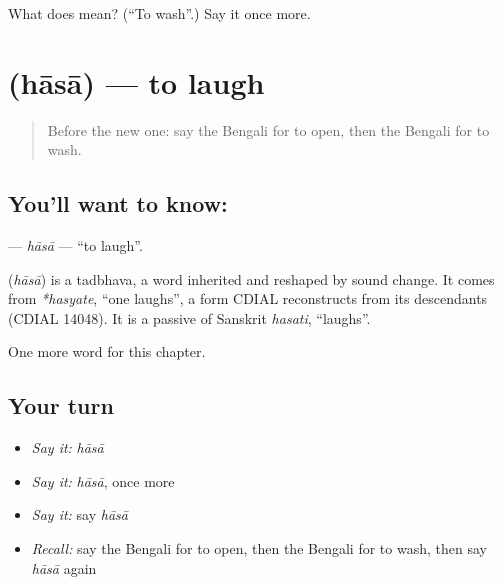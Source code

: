 \begin{tcolorbox}[breakable,colback=teal!4,colframe=teal!35!black,title={Before you move on}]
What does  mean? (\textquotedblleft{}To wash\textquotedblright{}.) Say it once more.
\end{tcolorbox}
\section[\texorpdfstring{\bn{হাসা} (hāsā)}{হাসা (hāsā)}]{ (hāsā) — to laugh}

\label{lesson:BN-C50-hasa}



\begin{quote}
Before the new one: say the Bengali for to open, then the Bengali for to wash.
\end{quote}

\subsection*{You'll want to know: }
\textbf{} — \emph{hāsā} — \textquotedblleft{}to laugh\textquotedblright{}.

\begin{cousinweb}
\textbf{} (\emph{hāsā}) is a tadbhava, a word inherited and reshaped by sound change. It comes from \emph{*hasyate}, \textquotedblleft{}one laughs\textquotedblright{}, a form CDIAL reconstructs from its descendants (CDIAL 14048). It is a passive of Sanskrit \emph{hasati}, \textquotedblleft{}laughs\textquotedblright{}.
\end{cousinweb}

\begin{grammarlens}[title={What you've built}]
One more word for this chapter.
\end{grammarlens}

\subsection*{Your turn}
\begin{itemize}
\raggedright
  \item \emph{Say it:} \emph{hāsā}
  \item \emph{Say it:} \emph{hāsā}, once more
  \item \emph{Say it:} say \emph{hāsā}
  \item \emph{Recall:} say the Bengali for to open, then the Bengali for to wash, then say \emph{hāsā} again
\end{itemize}


